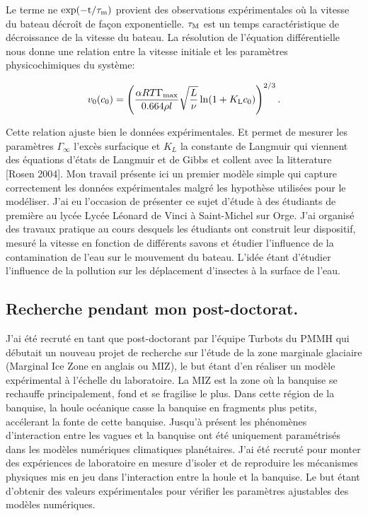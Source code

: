 \documentclass[french, 10pt]{article}
\begin{document}
Le terme ne $\rm exp(-t/\tau_m)$ provient des observations expérimentales où la vitesse du bateau décroît de façon exponentielle. $\tau_{\rm M}$ est un temps caractéristique de décroissance de la vitesse du bateau. La résolution de l'équation différentielle nous donne une relation entre la vitesse initiale et les paramètres physicochimiques du système:

\begin{equation}
  v_0(c_0)=\left(\frac{\alpha RT\Gamma_{\rm max}}{0.664\rho l}\sqrt{\frac{L}{\nu}}\ln(1+K_{\rm L}c_0)\right)^{2/3}.
  \label{eqn:v0}
\end{equation}

Cette relation ajuste bien le données expérimentales. Et permet de mesurer les paramètres $\Gamma_\infty$ l'excès surfacique et $K_L$ la constante de Langmuir qui viennent des équations d'états de Langmuir et de Gibbs et collent avec la litterature [Rosen 2004]. Mon travail présente ici un premier modèle simple qui capture correctement les données expérimentales malgré les hypothèse utilisées pour le modéliser. J'ai eu l'occasion de présenter ce sujet d'étude à des étudiants de première au lycée Lycée Léonard de Vinci à Saint-Michel sur Orge. J'ai organisé des travaux pratique au cours desquels les étudiants ont construit leur dispositif, mesuré la vitesse en fonction de différents savons et étudier l'influence de la contamination de l'eau sur le mouvement du bateau. L'idée étant d'étudier l'influence de la pollution sur les déplacement d'insectes à la surface de l'eau.

\subsection{Recherche pendant mon post-doctorat.}

J'ai été recruté en tant que post-doctorant par l'équipe Turbots du PMMH qui débutait un nouveau projet de recherche sur l'étude de la zone marginale glaciaire (Marginal Ice Zone en anglais ou MIZ), le but étant d'en réaliser un modèle expérimental à l'échelle du laboratoire. La MIZ est la zone où la banquise se rechauffe principalement, fond et se fragilise le plus. Dans cette région de la banquise, la houle océanique casse la banquise en fragments plus petits, accélerant la fonte de cette banquise. Jusqu'à présent les phénomènes d'interaction entre les vagues et la banquise ont été uniquement paramétrisés dans les modèles numériques climatiques planétaires. J'ai été recruté pour monter des expériences de laboratoire en mesure d'isoler et de reproduire les mécanismes physiques mis en jeu dans l'interaction entre la houle et la banquise. Le but étant d'obtenir des valeurs expérimentales pour vérifier les paramètres ajustables des modèles numériques.\medskip
\end{document}
